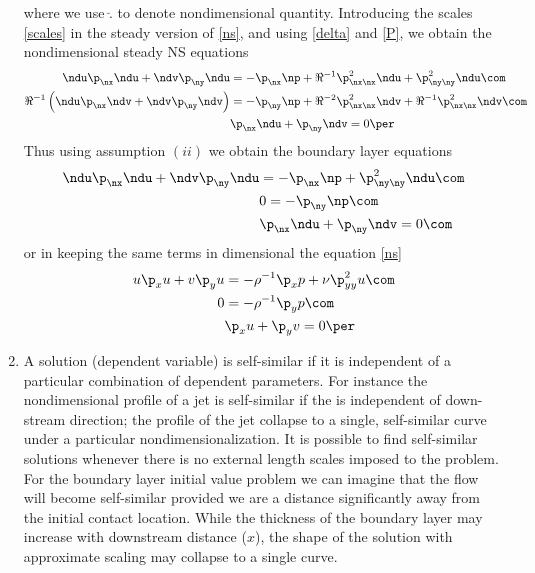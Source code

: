 \documentclass[11pt]{article}
\begin{document}
\begin{enumerate}[label=(\alph*)]
    \eeq
    where we use $\breve .$ to denote nondimensional quantity. Introducing the scales \eqref{scales} in the steady version of \eqref{ns}, and using  \eqref{delta} and \eqref{P}, we obtain the nondimensional steady NS equations 
        \begin{align}
            \label{ns_nd}
            \ndu\p_{\nx} \ndu + \ndv\p_{\ny} \ndu &= -\p_{\nx} \np + \Re^{-1} \p^2_{\nx\nx}\ndu +\p^2_{\ny\ny}\ndu\com\nonumber\\
            \Re^{-1} \left(\ndu\p_{\nx} \ndv + \ndv\p_{\ny} \ndv\right) &= -\p_{\ny} \np + \Re^{-2} \p^2_{\nx\nx}\ndv +  \Re^{-1} \p^2_{\nx\nx}\ndv\com\nonumber\\
                                                                        &\p_{\nx} \ndu + \p_{\ny} \ndv = 0\per
        \end{align}
        Thus using assumption $(ii)$ we obtain the boundary layer equations
        \begin{align}
            \label{ns__bl}
            \ndu\p_{\nx} \ndu + \ndv\p_{\ny} \ndu &= -\p_{\nx} \np + \p^2_{\ny\ny}\ndu\com\nonumber\\
                                                  & 0 = -\p_{\ny} \np \nonumber \com\\
             &\p_{\nx} \ndu + \p_{\ny} \ndv = 0\com
        \end{align}
        or in keeping the same terms in dimensional the equation \eqref{ns} 
\begin{align}
            \label{ns_bl}
           u\p_x u + v\p_y u &= -\rho^{-1}\p_x p + \nu  \p^2_{yy}u\com\nonumber\\
         0 &= -\rho^{-1}\p_y p \nonumber\com \\
           &\p_x u + \p_y v= 0\per
\end{align}

\item A solution (dependent variable) is self-similar if it is independent of a particular combination of dependent parameters. For instance the nondimensional profile of a jet is self-similar if the is independent of down-stream direction; the profile of the jet collapse to a single, self-similar curve under a particular nondimensionalization. It is possible to find self-similar solutions whenever there is no external length scales imposed to the problem. For the boundary layer initial value problem we can imagine that the flow will become self-similar provided we are a distance significantly away from the initial contact location. While the thickness of the boundary layer may increase with downstream distance ($x$), the shape of the solution with approximate scaling may collapse to a single curve.


\end{enumerate}
\end{document}
